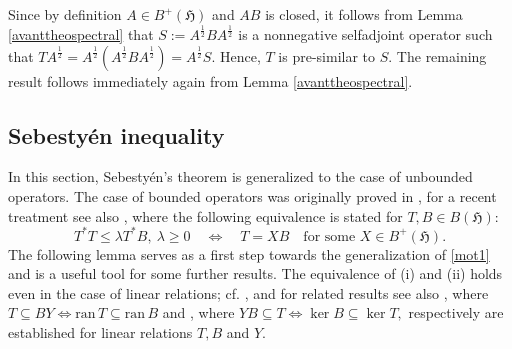 \documentclass{amsart}
\makeatletter
\newcommand{\ifaf}{\Leftrightarrow}
\newcommand{\h}{\mathfrak{H}}
\newcommand{\ran}{\mathrm{ran}\,}
\newcommand{\bh}{B(\h)}
\newcommand{\tstar}{T^{*}}
\newcommand{\half}{^{\frac{1}{2}}}
\newcommand{\inclu}{\subseteq}
\newcommand{\lplus}{B^{+}(\h)}
\numberwithin{equation}{section}
\renewenvironment{proof}[1][\proofname]{%
   \par\pushQED{\qed}\normalfont%
   \topsep6\p@\@plus6\p@\relax
   \trivlist\item[\hskip\labelsep\bfseries#1\@addpunct{.}]%
   \ignorespaces
}{%
   \popQED\endtrivlist\@endpefalse
}
\makeatother
\begin{document}
\begin{proof}
Since by definition $A  \in \lplus$ and $AB$ is closed,  it follows from  Lemma \ref{avanttheospectral}  that
    $S:= A\half B A\half $ is a nonnegative selfadjoint operator such that
    $T A\half= A\half (A\half B A\half ) = A\half S.$ Hence,
    $T$ is pre-similar to $S.$ The remaining result follows immediately again from Lemma \ref{avanttheospectral}.
\end{proof}




\subsection{Sebestyén inequality}

In this section,  Sebestyén's theorem is generalized to the case of unbounded operators. The case of bounded operators was originally proved in \cite{sebestyen1983restrictions}, for a recent treatment see also \cite{gustavo2013products,product2021}, where  the following equivalence is stated for $T,B  \in \bh:$
\begin{equation}\label{mot1}
\tstar T \leq \lambda \tstar B, \ \lambda \geq 0 \quad  \ifaf \quad T= XB  \quad \text{for some } X \in \lplus.
\end{equation}
 The following lemma serves as a first step towards the generalization of \eqref{mot1} and is a useful tool for some further results. The equivalence of (i) and (ii) holds  even in the case of linear relations; cf.  \cite[Lemma 4.2]{hassi22014},  and for related results see also  \cite[ Theorem 2.2]{popovici2013factorizations},
  where $T \inclu BY \ifaf \ran T \inclu \ran B  $ and     \cite[Lemma 3.1]{sandovici2025}, where  $YB \inclu T \ifaf \ker B \inclu \ker T,$  respectively are established for   linear relations $T,B$ and $Y$.
\end{document}
